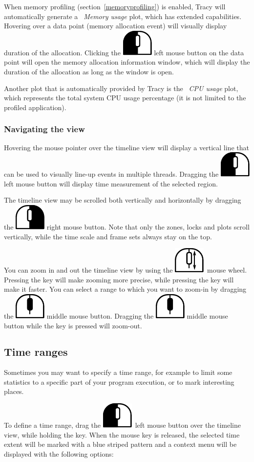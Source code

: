 \documentclass[hidelinks,titlepage,a4paper]{article}
\newcommand{\LMB}{\includegraphics[height=.8\baselineskip]{icons/lmb}}
\newcommand{\RMB}{\includegraphics[height=.8\baselineskip]{icons/rmb}}
\newcommand{\MMB}{\includegraphics[height=.8\baselineskip]{icons/mmb}}
\newcommand{\Scroll}{\includegraphics[height=.8\baselineskip]{icons/scroll}}
\begin{document}
When memory profiling (section~\ref{memoryprofiling}) is enabled, Tracy will automatically generate a \emph{\faMemory{}~Memory usage} plot, which has extended capabilities. Hovering over a data point (memory allocation event) will visually display duration of the allocation. Clicking the \LMB{} left mouse button on the data point will open the memory allocation information window, which will display the duration of the allocation as long as the window is open.

Another plot that is automatically provided by Tracy is the \emph{\faTachometer*{}~CPU usage} plot, which represents the total system CPU usage percentage (it is not limited to the profiled application).

\subsubsection{Navigating the view}

Hovering the \faMousePointer{} mouse pointer over the timeline view will display a vertical line that can be used to visually line-up events in multiple threads. Dragging the \LMB{} left mouse button will display time measurement of the selected region.

The timeline view may be scrolled both vertically and horizontally by dragging the \RMB{} right mouse button. Note that only the zones, locks and plots scroll vertically, while the time scale and frame sets always stay on the top.

You can zoom in and out the timeline view by using the \Scroll{}~mouse wheel. Pressing the \keys{\ctrl} key will make zooming more precise, while pressing the \keys{\shift} key will make it faster. You can select a range to which you want to zoom-in by dragging the \MMB{} middle mouse button. Dragging the \MMB{} middle mouse button while the \keys{\ctrl} key is pressed will zoom-out.

\subsection{Time ranges}
\label{timeranges}

Sometimes you may want to specify a time range, for example to limit some statistics to a specific part of your program execution, or to mark interesting places.

To define a time range, drag the \LMB{}~left mouse button over the timeline view, while holding the \keys{\ctrl} key. When the mouse key is released, the selected time extent will be marked with a blue striped pattern and a context menu will be displayed with the following options:
\end{document}
